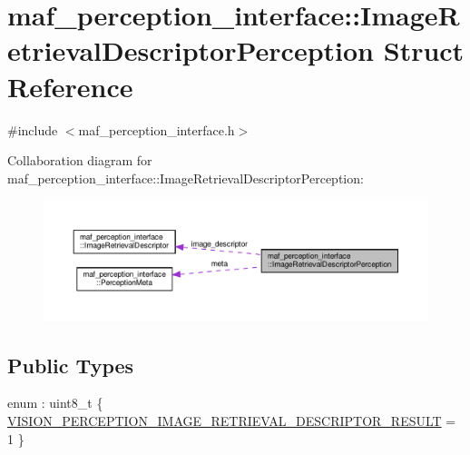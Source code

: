 \hypertarget{structmaf__perception__interface_1_1ImageRetrievalDescriptorPerception}{}\section{maf\+\_\+perception\+\_\+interface\+:\+:Image\+Retrieval\+Descriptor\+Perception Struct Reference}
\label{structmaf__perception__interface_1_1ImageRetrievalDescriptorPerception}


{\ttfamily \#include $<$maf\+\_\+perception\+\_\+interface.\+h$>$}



Collaboration diagram for maf\+\_\+perception\+\_\+interface\+:\+:Image\+Retrieval\+Descriptor\+Perception\+:\nopagebreak
\begin{figure}[H]
\begin{center}
\leavevmode
\includegraphics[width=350pt]{structmaf__perception__interface_1_1ImageRetrievalDescriptorPerception__coll__graph}
\end{center}
\end{figure}
\subsection*{Public Types}
\begin{DoxyCompactItemize}
\item 
enum \+: uint8\+\_\+t \{ \hyperlink{structmaf__perception__interface_1_1ImageRetrievalDescriptorPerception_a245d1a6b59d93ce20012a84d261f952ba80932a50ec9e5da27690c804fec6892c}{V\+I\+S\+I\+O\+N\+\_\+\+P\+E\+R\+C\+E\+P\+T\+I\+O\+N\+\_\+\+I\+M\+A\+G\+E\+\_\+\+R\+E\+T\+R\+I\+E\+V\+A\+L\+\_\+\+D\+E\+S\+C\+R\+I\+P\+T\+O\+R\+\_\+\+R\+E\+S\+U\+LT} = 1
 \}
\end{DoxyCompactItemize}
